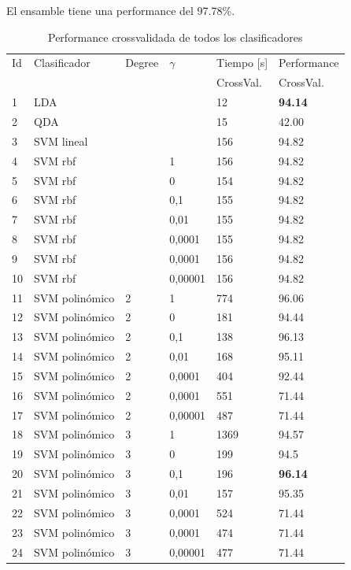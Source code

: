 \documentclass[journal]{IEEEtran}
\begin{document}
El ensamble tiene una performance del 97.78\%.

\begin{table}[!hb]
\caption{Performance crossvalidada de todos los clasificadores}
\label{table:main_results}
\centering
\begin{tabular}{l | l l l | l l}
	Id	&	Clasificador	&	Degree	&    $\gamma$	& Tiempo [s]  &	Performance \\
	&			&		&		&	CrossVal.	&	CrossVal. \\
\hline
	1	&	LDA	&		&		&	12	&	\textbf{94.14} \\
\hline
	2	&	QDA	&		&		&	15	&	42.00 \\
\hline
	3	&	SVM lineal 	&		&		&	156	&	94.82 \\
	4	&	SVM rbf  	&		&	1	&	156	&	94.82 \\
	5	&	SVM rbf  	&		&	0	&	154	&	94.82 \\
	6	&	SVM rbf  	&		&	 0,1 	&	155	&	94.82 \\
	7	&	SVM rbf  	&		&	 0,01 	&	155	&	94.82 \\
	8	&	SVM rbf  	&		&	0,0001	&	155	&	94.82 \\
	9	&	SVM rbf  	&		&	 0,0001 	&	156	&	94.82 \\
	10	&	SVM rbf  	&		&	 0,00001 	&	156	&	94.82 \\
	11	&	SVM polinómico 	&	2	&	1	&	774	&	96.06 \\
	12	&	SVM polinómico 	&	2	&	0	&	181	&	94.44 \\
	13	&	SVM polinómico 	&	2	&	 0,1  	&	138	&	96.13 \\
	14	&	SVM polinómico 	&	2	&	 0,01  	&	168	&	95.11 \\
	15	&	SVM polinómico 	&	2	&	0,0001	&	404	&	92.44 \\
	16	&	SVM polinómico 	&	2	&	 0,0001  	&	551	&	71.44 \\
	17	&	SVM polinómico 	&	2	&	 0,00001  	&	487	&	71.44 \\
	18	&	SVM polinómico 	&	3	&	1	&	1369	&	94.57 \\
	19	&	SVM polinómico 	&	3	&	0	&	199	&	94.5 \\
	20	&	SVM polinómico 	&	3	&	 0,1  	&	196	&	\textbf{96.14} \\
	21	&	SVM polinómico 	&	3	&	 0,01  	&	157	&	95.35 \\
	22	&	SVM polinómico 	&	3	&	0,0001	&	524	&	71.44 \\
	23	&	SVM polinómico 	&	3	&	 0,0001  	&	474	&	71.44 \\
	24	&	SVM polinómico 	&	3	&	 0,00001  	&	477	&	71.44 \\

\end{tabular}
\end{table}
\end{document}
